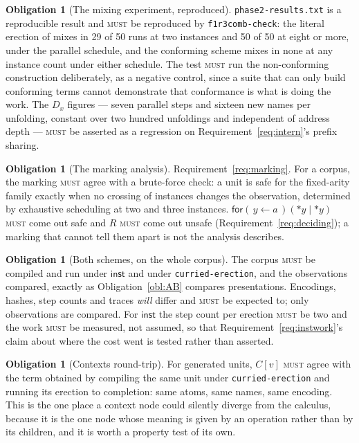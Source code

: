\documentclass[11pt,a4paper]{article}
\newcommand{\code}[1]{\texttt{#1}}
\newcommand{\MUST}{\textsc{must}}
\newcommand{\drp}[1]{{*}#1}
\newcommand{\inp}[3]{\mathsf{for}(\,#1 \leftarrow #2\,)#3}
\newcommand{\inst}{\mathsf{inst}}
\theoremstyle{definition}
\newtheorem{obligation}[definition]{Obligation}
\theoremstyle{plain}
\begin{document}
\begin{obligation}[The mixing experiment, reproduced]\label{obl:mixing}
\code{phase2-results.txt} is a reproducible result and \MUST{} be reproduced
by \code{f1r3comb-check}: the literal erection of
\cite[Def.~6.8]{draft3} mixes in 29 of 50 runs at two instances and 50 of 50
at eight or more, under the parallel schedule, and the conforming scheme mixes
in none at any instance count under either schedule. The test \MUST{} run the
non-conforming construction deliberately, as a negative control, since a suite
that can only build conforming terms cannot demonstrate that conformance is
what is doing the work. The $D_{x}$ figures --- seven parallel steps and
sixteen new names per unfolding, constant over two hundred unfoldings and
independent of address depth --- \MUST{} be asserted as a regression on
Requirement~\ref{req:intern}'s prefix sharing.
\end{obligation}

\begin{obligation}[The marking analysis]\label{obl:marking}
Requirement~\ref{req:marking}. For a corpus, the marking \MUST{} agree with a
brute-force check: a unit is safe for the fixed-arity family exactly when no
crossing of instances changes the observation, determined by exhaustive
scheduling at two and three instances. $\inp{y}{a}{(\drp{y} \mid \drp{y})}$
\MUST{} come out safe and $R$ \MUST{} come out unsafe
(Requirement~\ref{req:deciding}); a marking that cannot tell them apart is
not the analysis \cite[Rem.~6.20]{draft3} describes.
\end{obligation}

\begin{obligation}[Both schemes, on the whole corpus]\label{obl:schemes}
The corpus \MUST{} be compiled and run under $\inst$ and under
\code{curried-erection}, and the observations compared, exactly as
Obligation~\ref{obl:AB} compares presentations. Encodings, hashes, step counts
and traces \emph{will} differ and \MUST{} be expected to; only observations are
compared. For $\inst$ the step count per erection \MUST{} be two and the work
\MUST{} be measured, not assumed, so that
Requirement~\ref{req:instwork}'s claim about where the cost went is tested
rather than asserted.
\end{obligation}

\begin{obligation}[Contexts round-trip]\label{obl:context}
For generated units, $C[v]$ \MUST{} agree with the term obtained by compiling
the same unit under \code{curried-erection} and running its erection to
completion: same atoms, same names, same encoding. This is the one place a
context node could silently diverge from the calculus, because it is the one
node whose meaning is given by an operation rather than by its children, and
it is worth a property test of its own.
\end{obligation}
\end{document}
